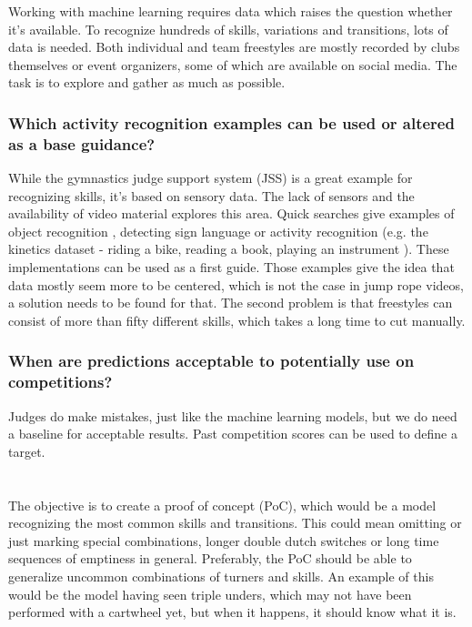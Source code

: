 Working with machine learning requires data which raises the question whether it's available. To recognize hundreds of skills, variations and transitions, lots of data is needed. Both individual and team freestyles are mostly recorded by clubs themselves or event organizers, some of which are available on social media. The task is to explore and gather as much as possible.

\subsubsection{Which activity recognition examples can be used or altered as a base guidance?}
\label{intro-bp:question-earlier-research-guidance}

While the gymnastics judge support system (JSS) is a great example for recognizing skills, it's based on sensory data. The lack of sensors and the availability of video material explores this area.
Quick searches give examples of object recognition \autocite{Diwaker_2022}, detecting sign language \autocite{Bora_2023} or activity recognition (e.g. the kinetics dataset - riding a bike, reading a book, playing an instrument \autocite{Kay_2017}).
These implementations can be used as a first guide.
Those examples give the idea that data mostly seem more to be centered, which is not the case in jump rope videos, a solution needs to be found for that. The second problem is that freestyles can consist of more than fifty different skills, which takes a long time to cut manually.

\subsubsection{When are predictions acceptable to potentially use on competitions?}
\label{intro-bp:question-acceptable-results}

Judges do make mistakes, just like the machine learning models, but we do need a baseline for acceptable results. Past competition scores can be used to define a target.

\section{}%
\label{sec:onderzoeksdoelstelling}

The objective is to create a proof of concept (PoC), which would be a model recognizing the most common skills and transitions.
This could mean omitting or just marking special combinations, longer double dutch switches or long time sequences of emptiness in general. Preferably, the PoC should be able to generalize uncommon combinations of turners and skills. An example of this would be the model having seen triple unders, which may not have been performed with a cartwheel yet, but when it happens, it should know what it is.

